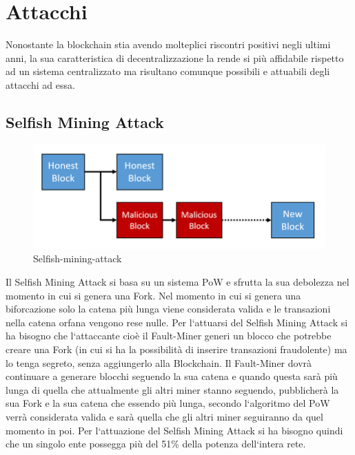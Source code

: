 \documentclass[11pt,a4paper,titlepage,twoside,openright]{report}
\begin{document}
\section{Attacchi}
Nonostante la blockchain stia avendo molteplici riscontri positivi negli ultimi anni, la sua caratteristica di decentralizzazione la rende si più affidabile rispetto ad un sistema centralizzato ma risultano comunque possibili e attuabili degli attacchi ad essa.

\subsection{Selfish Mining Attack}
\begin{figure}[h]
	\includegraphics[width=\textwidth]{Selfish-mining-attack}
	\centering
	\caption{Selfish-mining-attack}
	\label{fig:SM-attack}
\end{figure}
Il Selfish Mining Attack si basa su un sistema PoW e sfrutta la sua debolezza nel momento in cui si genera una Fork. Nel momento in cui si genera una biforcazione solo la catena più lunga viene considerata valida e le transazioni nella catena orfana vengono rese nulle. Per l`attuarsi del Selfish Mining Attack si ha bisogno che l`attaccante cioè il Fault-Miner generi un blocco che potrebbe creare una Fork (in cui si ha la possibilità di inserire transazioni fraudolente) ma lo tenga segreto, senza aggiungerlo alla Blockchain. Il Fault-Miner dovrà continuare a generare blocchi seguendo la sua catena e quando questa sarà più lunga di quella che attualmente gli altri miner stanno seguendo, pubblicherà la sua Fork e la sua catena che essendo più lunga, secondo l`algoritmo del PoW verrà considerata valida e sarà quella che gli altri miner seguiranno da quel momento in poi. Per l`attuazione del Selfish Mining Attack si ha bisogno quindi che un singolo ente possegga più del 51\% della potenza dell`intera rete.
\end{document}
